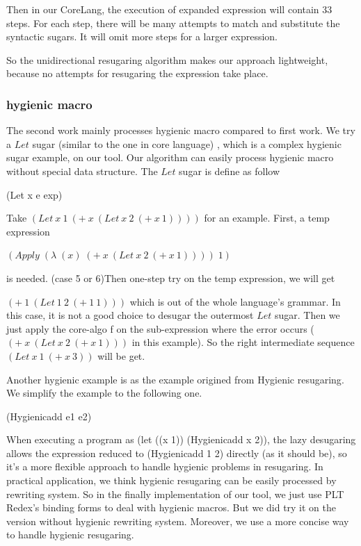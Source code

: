 Then in our CoreLang, the execution of expanded expression will contain 33 steps. For each step, there will be many attempts to match and substitute the syntactic sugars. It will omit more steps for a larger expression.

So the unidirectional resugaring algorithm makes our approach lightweight, because no attempts for resugaring the expression take place.
\subsubsection{hygienic macro}
\label{mark:hygienic}

The second work\cite{hygienic} mainly processes hygienic macro compared to first work. We try a $Let$ sugar (similar to the one in core language) , which is a complex hygienic sugar example, on our tool. Our algorithm can easily process hygienic macro without special data structure. The $Let$ sugar is define as follow
\begin{Codes}
	(Let x e exp) 
\end{Codes}

Take $(Let~x~1~(+~x~(Let~x~2~(+~x~1))))$ for an example. First, a temp expression

$(Apply\;(\lambda\;(x)\;(+~x~(Let~x~2~(+~x~1))))\;1)$

is needed. (case 5 or 6)Then one-step try on the temp expression, we will get

$(+~1~(Let~1~2~(+~1~1)))$ which is out of the whole language's grammar. In this case, it is not a good choice to desugar the outermost $Let$ sugar. Then we just apply the core-algo f on the sub-expression where the error occurs ($(+~x~(Let~x~2~(+~x~1)))$ in this example). So the right intermediate sequence $(Let~x~1~(+~x~3))$ will be get.

Another hygienic example is as the example origined from Hygienic resugaring\cite{hygienic}. We simplify the example to the following one.
\begin{Codes}
	(Hygienicadd e1 e2) 
\end{Codes}

When executing a program as (let ((x 1)) (Hygienicadd x 2)), the lazy desugaring allows the expression reduced to (Hygienicadd 1 2) directly (as it should be), so it's a more flexible approach to handle hygienic problems in resugaring.
In practical application, we think hygienic resugaring can be easily processed by rewriting system. So in the finally implementation of our tool, we just use PLT Redex's binding forms to deal with hygienic macros. But we did try it on the version without hygienic rewriting system. Moreover, we use a more concise way to handle hygienic resugaring.

